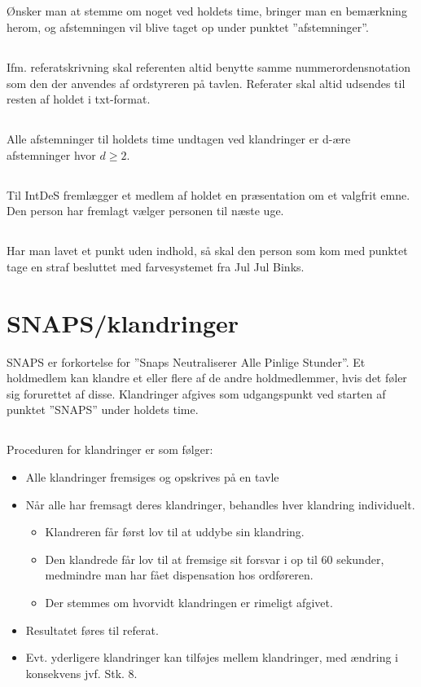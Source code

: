 \documentclass{article}
\begin{document}
	\subsection{}
	Ønsker man at stemme om noget ved holdets time, bringer man en bemærkning herom, og afstemningen vil blive taget op under punktet ”afstemninger”.
	\subsection{}
	Ifm. referatskrivning skal referenten altid benytte samme nummerordensnotation som den der anvendes af ordstyreren på tavlen. Referater skal altid udsendes til resten af holdet i txt-format.
	\subsection{}
	Alle afstemninger til holdets time undtagen ved klandringer er d-ære afstemninger hvor $d \geq 2$.
	\subsection{}
	Til IntDeS fremlægger et medlem af holdet en præsentation om et valgfrit emne. Den person har fremlagt vælger personen til næste uge.
	\subsection{}
	Har man lavet et punkt uden indhold, så skal den person som kom med punktet tage en straf besluttet med farvesystemet fra Jul Jul Binks.
	
	\section{SNAPS/klandringer}
	SNAPS er forkortelse for ”Snaps Neutraliserer Alle Pinlige Stunder”. Et holdmedlem kan klandre et eller flere af de andre holdmedlemmer, hvis det føler sig forurettet af disse. Klandringer afgives som udgangspunkt ved starten af punktet ”SNAPS” under holdets time.
	\subsection{}
	Proceduren for klandringer er som følger:
	\begin{itemize}
		\item Alle klandringer fremsiges og opskrives på en tavle
		\item Når alle har fremsagt deres klandringer, behandles hver klandring individuelt.
		\begin{itemize}
			\item Klandreren får først lov til at uddybe sin klandring.
			\item Den klandrede får lov til at fremsige sit forsvar i op til 60 sekunder, medmindre man har fået dispensation hos ordføreren.
			\item Der stemmes om hvorvidt klandringen er rimeligt afgivet.
		\end{itemize}
		\item Resultatet føres til referat.
		\item Evt. yderligere klandringer kan tilføjes mellem klandringer, med ændring i konsekvens jvf. Stk. 8.  
	\end{itemize}
\end{document}
